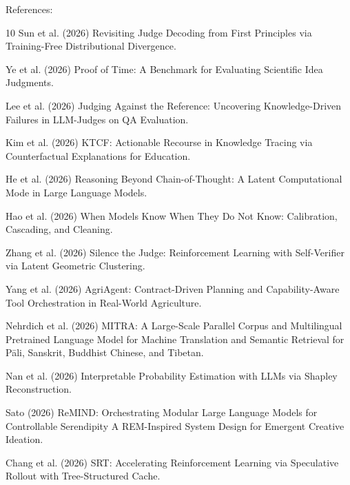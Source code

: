 References:
\begin{thebibliography}{10}
Sun et al. (2026) Revisiting Judge Decoding from First Principles via Training-Free Distributional Divergence.

Ye et al. (2026) Proof of Time: A Benchmark for Evaluating Scientific Idea Judgments.

Lee et al. (2026) Judging Against the Reference: Uncovering Knowledge-Driven Failures in LLM-Judges on QA Evaluation.

Kim et al. (2026) KTCF: Actionable Recourse in Knowledge Tracing via Counterfactual Explanations for Education.

He et al. (2026) Reasoning Beyond Chain-of-Thought: A Latent Computational Mode in Large Language Models.

Hao et al. (2026) When Models Know When They Do Not Know: Calibration, Cascading, and Cleaning.

Zhang et al. (2026) Silence the Judge: Reinforcement Learning with Self-Verifier via Latent Geometric Clustering.

Yang et al. (2026) AgriAgent: Contract-Driven Planning and Capability-Aware Tool Orchestration in Real-World Agriculture.

Nehrdich et al. (2026) MITRA: A Large-Scale Parallel Corpus and Multilingual Pretrained Language Model for Machine Translation and Semantic Retrieval for P\=ali, Sanskrit, Buddhist Chinese, and Tibetan.

Nan et al. (2026) Interpretable Probability Estimation with LLMs via Shapley Reconstruction.

Sato (2026) ReMIND: Orchestrating Modular Large Language Models for Controllable Serendipity A REM-Inspired System Design for Emergent Creative Ideation.

Chang et al. (2026) SRT: Accelerating Reinforcement Learning via Speculative Rollout with Tree-Structured Cache.


\end{thebibliography}
